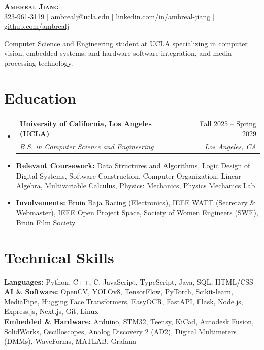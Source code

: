 \documentclass[letterpaper,10pt]{article}
\makeatletter
\newcommand{\resumeItem}[1]{
  \item\small{
    {#1 \vspace{-3pt}}
  }
}
\newcommand{\resumeSubheading}[4]{
  \vspace{-3pt}\item
    \begin{tabular*}{0.97\textwidth}[t]{l@{\extracolsep{\fill}}r}
      \textbf{#1} & #2 \\
      \textit{\small#3} & \textit{\small #4} \\
    \end{tabular*}\vspace{-7pt}
}
\newcommand{\resumeSubHeadingListStart}{\begin{itemize}[leftmargin=0.15in, label={}]}
\newcommand{\resumeSubHeadingListEnd}{\end{itemize}}
\makeatother
\begin{document}

\begin{center}
    \textbf{\huge \scshape Ambreal Jiang} \\ \vspace{1pt}
    \small 323-961-3119 $|$ \href{ambrealj@ucla.edu}{\underline{ambrealj@ucla.edu}} $|$ 
    \href{https://www.linkedin.com/in/ambreal-jiang/}{\underline{linkedin.com/in/ambreal-jiang}} $|$
    \href{https://github.com/ambrealj}{\underline{github.com/ambrealj}} %
   \resumeItem{Computer Science and Engineering student at UCLA specializing in computer vision, embedded systems, and hardware-software integration, and media processing technology.}
\end{center}
\section{Education}
  \resumeSubHeadingListStart
    \resumeSubheading
      {University of California, Los Angeles (UCLA)}{Fall 2025 -- Spring 2029}
      {B.S. in Computer Science and Engineering}{Los Angeles, CA}
    \resumeItem{\textbf{Relevant Coursework: }Data Structures and Algorithms, Logic Design of Digital Systems, Software Construction, Computer Organization, Linear Algebra, Multivariable Calculus, Physics: Mechanics, Physics Mechanics Lab} \resumeItem{\textbf{Involvements: }Bruin Baja Racing (Electronics), IEEE WATT (Secretary \& Webmaster), IEEE Open Project Space, Society of Women Engineers (SWE), Bruin Film Society}
 
  \resumeSubHeadingListEnd


\section{Technical Skills}
 \begin{itemize}[leftmargin=0.15in, label={}]
    \small{\item{
     \textbf{Languages:}{ Python, C++, C, JavaScript, TypeScript, Java, SQL, HTML/CSS} \\
    \textbf{AI \& Software:}{ OpenCV, YOLOv8, TensorFlow, PyTorch, Scikit-learn, MediaPipe, Hugging Face Transformers, EasyOCR, FastAPI, Flask, Node.js, Express.js, Next.js, Git, Linux}\\
     \textbf{Embedded \& Hardware:}{ Arduino, STM32, Teensy, KiCad, Autodesk Fusion, SolidWorks, Oscilloscopes, Analog Discovery 2 (AD2), Digital Multimeters (DMMs), WaveForms, MATLAB, Grafana} \\
 
    }}
 \end{itemize}
\end{document}
